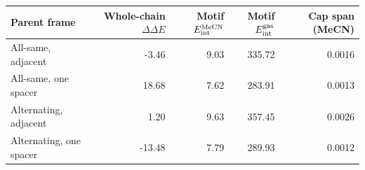 \begin{tabular}{lrrrr}\toprule
Parent frame & Whole-chain $\Delta\Delta E$ & Motif $E_{\rm int}^{\rm MeCN}$ & Motif $E_{\rm int}^{\rm gas}$ & Cap span (MeCN)\\\midrule
All-same, adjacent & -3.46 & 9.03 & 335.72 & 0.0016\\
All-same, one spacer & 18.68 & 7.62 & 283.91 & 0.0013\\
Alternating, adjacent & 1.20 & 9.63 & 357.45 & 0.0026\\
Alternating, one spacer & -13.48 & 7.79 & 289.93 & 0.0012\\
\bottomrule\end{tabular}
